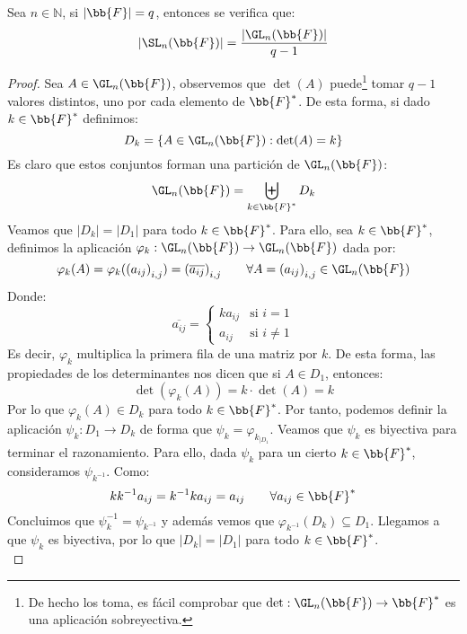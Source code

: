 \begin{prop}\label{prop:orden_sl}
    Sea $n\in \mathbb{N}$, si $|\bb{F}| = q$, entonces se verifica que:
    \begin{equation*}
        |\SL_n(\bb{F})| = \dfrac{|\GL_n(\bb{F})|}{q-1}
    \end{equation*}
    \begin{proof}
    Sea $A\in \GL_n(\bb{F})$, observemos que $\det(A)$ puede\footnote{De hecho los toma, es fácil comprobar que $\det:\GL_n(\bb{F})\to\bb{F}^\ast$ es una aplicación sobreyectiva.} tomar $q-1$ valores distintos, uno por cada elemento de $\bb{F}^\ast$. De esta forma, si dado $k\in \bb{F}^\ast$ definimos:
        \begin{equation*}
            D_k = \{A\in \GL_n(\bb{F}) : \det(A) = k\}
        \end{equation*}
        Es claro que estos conjuntos forman una partición de $\GL_n(\bb{F})$:
        \begin{equation*}
            \GL_n(\bb{F}) = \biguplus_{k\in \bb{F}^\ast} D_k 
        \end{equation*}
        Veamos que $|D_k| = |D_1|$ para todo $k\in \bb{F}^\ast$. Para ello, sea $k\in \bb{F}^\ast$, definimos la aplicación $\varphi_k:\GL_n(\bb{F})\to\GL_n(\bb{F})$ dada por:
        \begin{equation*}
            \varphi_k(A) = \varphi_k({(a_{ij})}_{i,j}) = {(\overline{a_{ij}})}_{i,j} \qquad \forall A={(a_{ij})}_{i,j} \in \GL_n(\bb{F})
        \end{equation*}
        Donde:
        \begin{equation*}
            \overline{a_{ij}} = \left\{\begin{array}{ll}
                    ka_{ij} & \text{si\ } i = 1 \\
                    a_{ij} & \text{si\ } i \neq 1 
            \end{array}\right.
        \end{equation*}
        Es decir, $\varphi_k$ multiplica la primera fila de una matriz por $k$. De esta forma, las propiedades de los determinantes nos dicen que si $A\in D_1$, entonces:
        \begin{equation*}
            \det(\varphi_k(A)) = k\cdot \det(A) = k
        \end{equation*}
        Por lo que $\varphi_k(A)\in D_k$ para todo $k\in \bb{F}^\ast$. Por tanto, podemos definir la aplicación $\psi_k:D_1\to D_k$ de forma que $\psi_k = \varphi_{k_{|D_1}}$. Veamos que $\psi_k$ es biyectiva para terminar el razonamiento. Para ello, dada $\psi_k$ para un cierto $k\in \bb{F}^\ast$, consideramos $\psi_{k^{-1}}$. Como:
        \begin{equation*}
            kk^{-1}a_{ij} = k^{-1}ka_{ij} = a_{ij} \qquad \forall a_{ij}\in \bb{F}^\ast
        \end{equation*}
        Concluimos que $\psi_k^{-1} = \psi_{k^{-1}}$ y además vemos que $\varphi_{k^{-1}}(D_k) \subseteq D_1$. Llegamos a que $\psi_k$ es biyectiva, por lo que $|D_k| = |D_1|$ para todo $k\in \bb{F}^\ast$.\\


\end{proof}
\end{prop}
